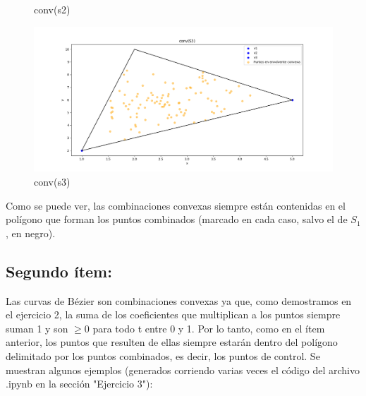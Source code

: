 \documentclass{article}
\begin{document}
\begin{figure}[H]
\begin{minipage}{0.45\textwidth}
        \caption{conv(s2)}
        \label{fig:grafico2}
    \end{minipage}
\begin{minipage}{0.45\textwidth}
        \centering
        \includegraphics[width=\textwidth]{imagenes/conv(s3).png}
        \caption{conv(s3)}
        \label{fig:grafico3}
    \end{minipage}
    \label{fig:tres_graficos}
\end{figure}

Como se puede ver, las combinaciones convexas siempre están contenidas en el polígono que forman los puntos combinados (marcado en cada caso, salvo el de $S_1$, en negro).

\subsection*{Segundo ítem:}
Las curvas de Bézier son combinaciones convexas ya que, como demostramos en el ejercicio 2, la suma de los coeficientes que multiplican a los puntos siempre suman 1 y son $\geq 0$ para todo t entre 0 y 1. Por lo tanto, como en el ítem anterior, los puntos que resulten de ellas siempre estarán dentro del polígono delimitado por los puntos combinados, es decir, los puntos de control. Se muestran algunos ejemplos (generados corriendo varias veces el código del archivo .ipynb en la sección "Ejercicio 3"):
\end{document}

